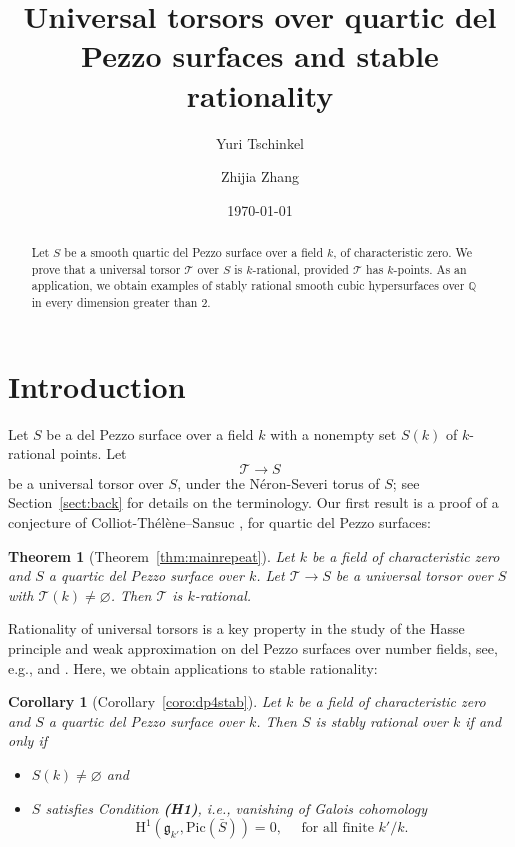 \documentclass[12pt, reqno]{amsart}
\title[Universal torsor and stable rationality]{Universal torsors over quartic del Pezzo surfaces and stable rationality}
\author[Yuri Tschinkel]{Yuri Tschinkel}
\author[Zhijia Zhang]{Zhijia Zhang}
\date{\today}
\theoremstyle{plain}
\newtheorem{theo}[prop]{Theorem}
\newtheorem{coro}[prop]{Corollary}
\theoremstyle{remark}
\theoremstyle{definition}
\numberwithin{equation}{section}
\def\cT{{\mathcal T}}
\def\rH{{\mathrm H}}
\def\Pic{\mathrm{Pic}}
\begin{document}
	
	
\begin{abstract}
Let $S$ be a smooth quartic del Pezzo surface over a field $k$, of characteristic zero. We prove that a universal torsor $\mathcal T$ over $S$ is $k$-rational, provided $\mathcal T$ has $k$-points.  
As an application, we obtain examples of stably rational smooth cubic hypersurfaces over $\mathbb Q$ in every dimension greater than 2.
\end{abstract}
	
	\maketitle

    
    
    \section{Introduction}
	\label{sect:intro}


Let $S$ be a del Pezzo surface over a field $k$ with a nonempty set 
$S(k)$ of $k$-rational points. 
Let 
$$
\cT\to S
$$
be a universal torsor over $S$, under the N\'eron-Severi torus of $S$; see Section~\ref{sect:back} for details on the terminology. 
Our first result is a proof of a conjecture of Colliot-Th\'el\`ene--Sansuc \cite[Section 2.8]{CTSansucDuke}, for quartic del Pezzo surfaces: 

\begin{theo}[Theorem~\ref{thm:mainrepeat}]
\label{thm:main}
Let $k$ be a field of characteristic zero and $S$ a quartic del Pezzo surface over $k$. Let $\cT\to S$ be a universal torsor over $S$ with $\cT(k)\neq \varnothing$. Then $\cT$ is $k$-rational.
\end{theo}

Rationality of universal torsors is a key property in the study of 
the Hasse principle and weak approximation on
del Pezzo surfaces over number fields, see, e.g., \cite{CTSansucDuke} and \cite{Salberger}. 
Here, we obtain applications to stable rationality:


\begin{coro}[Corollary~\ref{coro:dp4stab}]
\label{coro:stable}
Let $k$ be a field of characteristic zero and $S$ a quartic del Pezzo surface over $k$. 
Then $S$ is stably rational over $k$ if and only if 
\begin{itemize}
    \item $S(k)\neq \varnothing$ and
    \item $S$ satisfies Condition {\bf (H1)}, i.e., vanishing of Galois cohomology
    \begin{equation} 
    \label{eqn:h1}
\rH^1(\mathfrak g_{k'}, \Pic(\bar{S}))=0, \quad \text{ for all finite }  k'/k. 
    \end{equation}
\end{itemize}
\end{coro}
\end{document}
